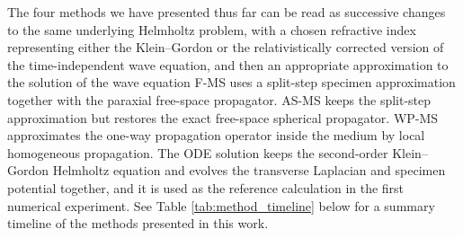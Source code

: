 \documentclass[preprint,12pt,number]{elsarticle}
\begin{document}
The four methods we have presented thus far can be read as successive changes to the same
underlying Helmholtz problem, with a chosen refractive index representing either
the Klein--Gordon or the relativistically corrected version of the
time-independent wave equation, and then an appropriate approximation to the solution of the wave equation
F-MS uses a split-step specimen approximation
together with the paraxial free-space propagator. AS-MS keeps the
split-step approximation but restores the exact free-space spherical propagator. WP-MS
approximates the one-way propagation operator inside the medium by local
homogeneous propagation. The ODE solution keeps the second-order
Klein--Gordon Helmholtz equation and evolves the transverse Laplacian and
specimen potential together, and it is used as the reference calculation in the first numerical experiment.
See Table \ref{tab:method_timeline} below for a summary timeline of the methods presented in this work.
\end{document}
